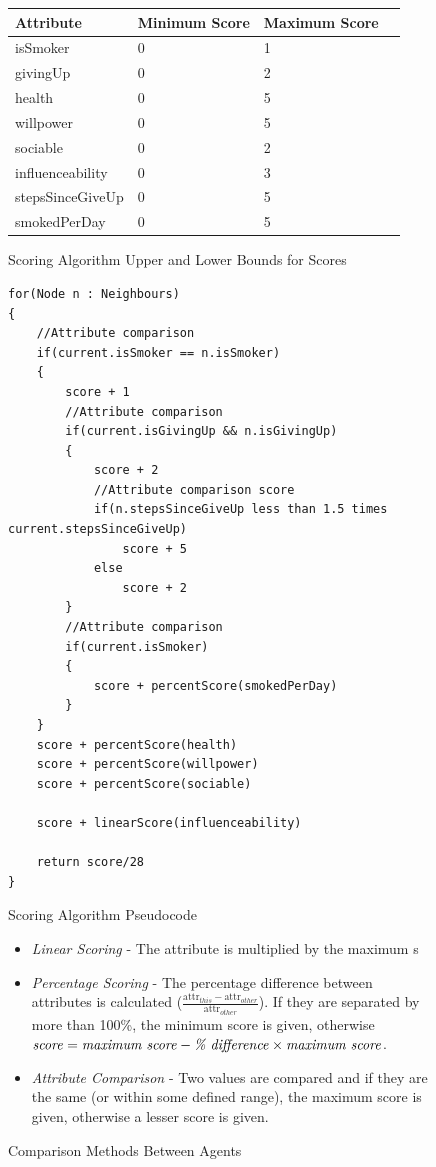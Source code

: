 \documentclass[]{report}
\begin{document}
\begin{figure}
\begin{center}
\label{tab:reconfig}
\begin{tabular}{|l||l|l|l|}
\hline
\bf{Attribute} & \bf{Minimum Score} & \bf{Maximum Score}\\
\hline
isSmoker 						& 0	&	1\\
givingUp						&	0	&	2\\
health							&	0	& 5\\
willpower						&	0	&	5\\
sociable						&	0	&	2\\
influenceability		&	0	&	3\\
stepsSinceGiveUp		&	0	&	5\\
smokedPerDay				&	0	&	5\\

\hline

\end{tabular}
\end{center}
\caption{Scoring Algorithm Upper and Lower Bounds for Scores}
\end{figure}

\begin{figure}
\begin{center}
	\begin{lstlisting}
for(Node n : Neighbours)
{
	//Attribute comparison
	if(current.isSmoker == n.isSmoker)
	{
		score + 1
		//Attribute comparison
		if(current.isGivingUp && n.isGivingUp)
		{
			score + 2
			//Attribute comparison score
			if(n.stepsSinceGiveUp less than 1.5 times current.stepsSinceGiveUp)
				score + 5
			else
				score + 2
		}
		//Attribute comparison
		if(current.isSmoker)
		{
			score + percentScore(smokedPerDay) 
		}
	}
	score + percentScore(health)
	score + percentScore(willpower)
	score + percentScore(sociable)

	score + linearScore(influenceability)

	return score/28
}
	\end{lstlisting}
\end{center}
\label{code:scoring}
\caption{Scoring Algorithm Pseudocode}
\end{figure}

\begin{figure}
\label{code:comp-methods}
\begin{itemize}
\item \emph{Linear Scoring} - The attribute is multiplied by the maximum s
\item \emph{Percentage Scoring} - The percentage difference between attributes is calculated ($\frac{\text{attr}_{this}-\text{attr}_{other}}{\text{attr}_{other}}$). If they are separated by more than 100\%, the minimum score is given, otherwise $\text{\emph{score}} = \text{\emph{maximum score}} - \text{\emph{\% difference}} \times \text{\emph{maximum score}}$.
\item \emph{Attribute Comparison} - Two values are compared and if they are the same (or within some defined range), the maximum score is given, otherwise a lesser score is given.
\end{itemize}
\caption{Comparison Methods Between Agents}
\end{figure}
\end{document}
